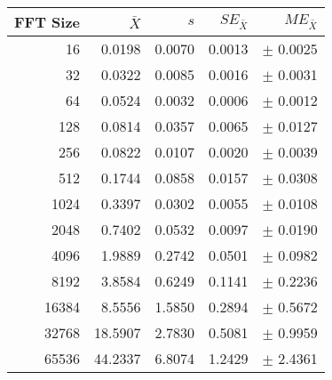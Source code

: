\begin{tabular}{|r|r|r|r|r|}\hline
    FFT Size & $\bar{X}$ & $s$ & $SE_{\bar{X}}$ & $ME_{\bar{X}}$ \\ \hline
    16 & 0.0198 & 0.0070 & 0.0013 & $\pm$ 0.0025 \\ \hline
    32 & 0.0322 & 0.0085 & 0.0016 & $\pm$ 0.0031 \\ \hline
    64 & 0.0524 & 0.0032 & 0.0006 & $\pm$ 0.0012 \\ \hline
    128 & 0.0814 & 0.0357 & 0.0065 & $\pm$ 0.0127 \\ \hline
    256 & 0.0822 & 0.0107 & 0.0020 & $\pm$ 0.0039 \\ \hline
    512 & 0.1744 & 0.0858 & 0.0157 & $\pm$ 0.0308 \\ \hline
    1024 & 0.3397 & 0.0302 & 0.0055 & $\pm$ 0.0108 \\ \hline
    2048 & 0.7402 & 0.0532 & 0.0097 & $\pm$ 0.0190 \\ \hline
    4096 & 1.9889 & 0.2742 & 0.0501 & $\pm$ 0.0982 \\ \hline
    8192 & 3.8584 & 0.6249 & 0.1141 & $\pm$ 0.2236 \\ \hline
    16384 & 8.5556 & 1.5850 & 0.2894 & $\pm$ 0.5672 \\ \hline
    32768 & 18.5907 & 2.7830 & 0.5081 & $\pm$ 0.9959 \\ \hline
    65536 & 44.2337 & 6.8074 & 1.2429 & $\pm$ 2.4361 \\ \hline
\end{tabular}
